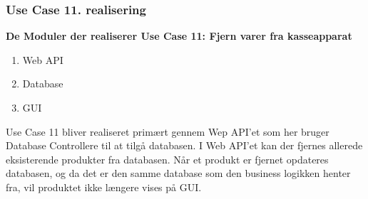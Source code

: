 \subsubsection{Use Case 11. realisering}
\textbf{De Moduler der realiserer Use Case 11: Fjern varer fra kasseapparat}

\begin{enumerate}
	\item Web API
	\item Database
	\item GUI
\end{enumerate}
	
Use Case 11 bliver realiseret primært gennem Wep API'et som her bruger Database Controllere til at tilgå databasen. I Web API'et kan der fjernes allerede eksisterende produkter fra databasen. Når et produkt er fjernet opdateres databasen, og da det er den samme database som den business logikken henter fra, vil produktet ikke længere vises på GUI. 